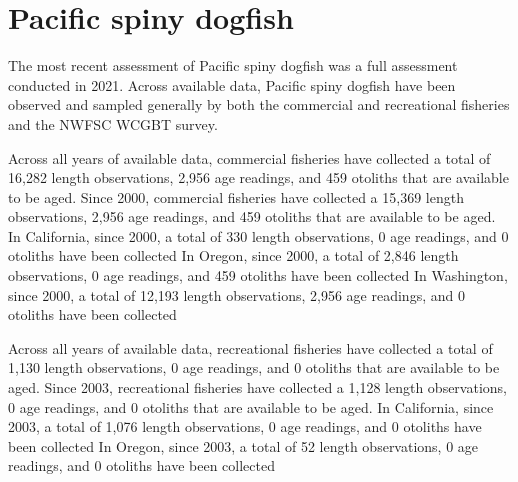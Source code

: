 \documentclass[11pt,
  english,
  letterpaper,
]{article}
\begin{document}

\hypertarget{pacific-spiny-dogfish}{%
\section{Pacific spiny dogfish}\label{pacific-spiny-dogfish}}

\leavevmode\tagmcend\tagstructend


The most recent assessment of Pacific spiny dogfish was a full assessment conducted in 2021. Across available data, Pacific spiny dogfish have been observed and sampled generally by both the commercial and recreational fisheries and the NWFSC WCGBT survey.

\leavevmode\tagmcend\tagstructend\par


Across all years of available data, commercial fisheries have collected a total of 16,282 length observations, 2,956 age readings, and 459 otoliths that are available to be aged. Since 2000, commercial fisheries have collected a 15,369 length observations, 2,956 age readings, and 459 otoliths that are available to be aged. In California, since 2000, a total of 330 length observations, 0 age readings, and 0 otoliths have been collected In Oregon, since 2000, a total of 2,846 length observations, 0 age readings, and 459 otoliths have been collected In Washington, since 2000, a total of 12,193 length observations, 2,956 age readings, and 0 otoliths have been collected

\leavevmode\tagmcend\tagstructend\par


Across all years of available data, recreational fisheries have collected a total of 1,130 length observations, 0 age readings, and 0 otoliths that are available to be aged. Since 2003, recreational fisheries have collected a 1,128 length observations, 0 age readings, and 0 otoliths that are available to be aged. In California, since 2003, a total of 1,076 length observations, 0 age readings, and 0 otoliths have been collected In Oregon, since 2003, a total of 52 length observations, 0 age readings, and 0 otoliths have been collected

\leavevmode\tagmcend\tagstructend\par
\end{document}
